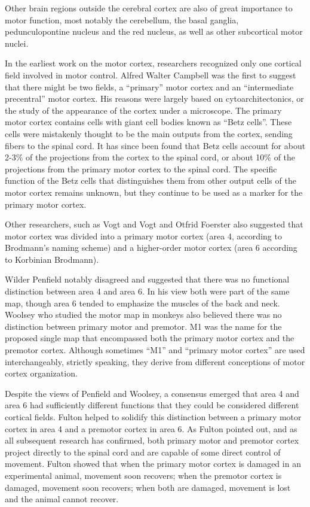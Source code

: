 \documentclass[]{book}
\begin{document}
Other brain regions outside the cerebral cortex are also of great importance to motor function, most notably the cerebellum, the basal ganglia, pedunculopontine nucleus and the red nucleus, as well as other subcortical motor nuclei.

In the earliest work on the motor cortex, researchers recognized only one cortical field involved in motor control. Alfred Walter Campbell was the first to suggest that there might be two fields, a ``primary'' motor cortex and an ``intermediate precentral'' motor cortex. His reasons were largely based on cytoarchitectonics, or the study of the appearance of the cortex under a microscope. The primary motor cortex contains cells with giant cell bodies known as ``Betz cells''. These cells were mistakenly thought to be the main outputs from the cortex, sending fibers to the spinal cord. It has since been found that Betz cells account for about 2-3\% of the projections from the cortex to the spinal cord, or about 10\% of the projections from the primary motor cortex to the spinal cord. The specific function of the Betz cells that distinguishes them from other output cells of the motor cortex remains unknown, but they continue to be used as a marker for the primary motor cortex.

Other researchers, such as Vogt and Vogt and Otfrid Foerster also suggested that motor cortex was divided into a primary motor cortex (area 4, according to Brodmann's naming scheme) and a higher-order motor cortex (area 6 according to Korbinian Brodmann).

Wilder Penfield notably disagreed and suggested that there was no functional distinction between area 4 and area 6. In his view both were part of the same map, though area 6 tended to emphasize the muscles of the back and neck. Woolsey who studied the motor map in monkeys also believed there was no distinction between primary motor and premotor. M1 was the name for the proposed single map that encompassed both the primary motor cortex and the premotor cortex. Although sometimes ``M1'' and ``primary motor cortex'' are used interchangeably, strictly speaking, they derive from different conceptions of motor cortex organization.

Despite the views of Penfield and Woolsey, a consensus emerged that area 4 and area 6 had sufficiently different functions that they could be considered different cortical fields. Fulton helped to solidify this distinction between a primary motor cortex in area 4 and a premotor cortex in area 6. As Fulton pointed out, and as all subsequent research has confirmed, both primary motor and premotor cortex project directly to the spinal cord and are capable of some direct control of movement. Fulton showed that when the primary motor cortex is damaged in an experimental animal, movement soon recovers; when the premotor cortex is damaged, movement soon recovers; when both are damaged, movement is lost and the animal cannot recover.
\end{document}
